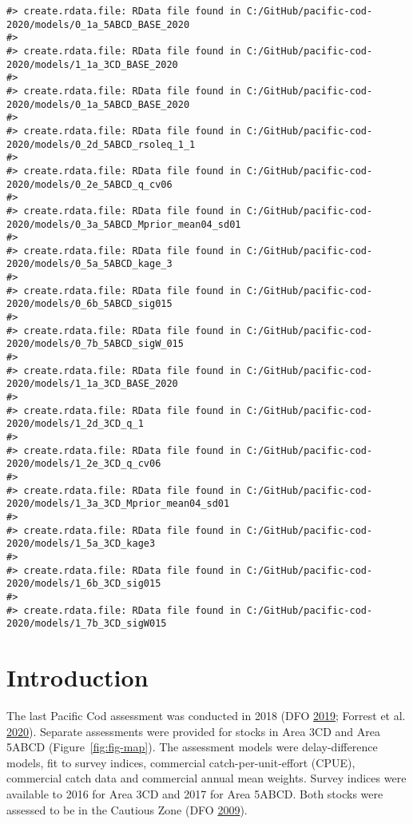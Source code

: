 \documentclass[11pt]{book}
\begin{document}
\frontmatter
\begin{verbatim}
#> create.rdata.file: RData file found in C:/GitHub/pacific-cod-2020/models/0_1a_5ABCD_BASE_2020
#> 
#> create.rdata.file: RData file found in C:/GitHub/pacific-cod-2020/models/1_1a_3CD_BASE_2020
#> 
#> create.rdata.file: RData file found in C:/GitHub/pacific-cod-2020/models/0_1a_5ABCD_BASE_2020
#> 
#> create.rdata.file: RData file found in C:/GitHub/pacific-cod-2020/models/0_2d_5ABCD_rsoleq_1_1
#> 
#> create.rdata.file: RData file found in C:/GitHub/pacific-cod-2020/models/0_2e_5ABCD_q_cv06
#> 
#> create.rdata.file: RData file found in C:/GitHub/pacific-cod-2020/models/0_3a_5ABCD_Mprior_mean04_sd01
#> 
#> create.rdata.file: RData file found in C:/GitHub/pacific-cod-2020/models/0_5a_5ABCD_kage_3
#> 
#> create.rdata.file: RData file found in C:/GitHub/pacific-cod-2020/models/0_6b_5ABCD_sig015
#> 
#> create.rdata.file: RData file found in C:/GitHub/pacific-cod-2020/models/0_7b_5ABCD_sigW_015
#> 
#> create.rdata.file: RData file found in C:/GitHub/pacific-cod-2020/models/1_1a_3CD_BASE_2020
#> 
#> create.rdata.file: RData file found in C:/GitHub/pacific-cod-2020/models/1_2d_3CD_q_1
#> 
#> create.rdata.file: RData file found in C:/GitHub/pacific-cod-2020/models/1_2e_3CD_q_cv06
#> 
#> create.rdata.file: RData file found in C:/GitHub/pacific-cod-2020/models/1_3a_3CD_Mprior_mean04_sd01
#> 
#> create.rdata.file: RData file found in C:/GitHub/pacific-cod-2020/models/1_5a_3CD_kage3
#> 
#> create.rdata.file: RData file found in C:/GitHub/pacific-cod-2020/models/1_6b_3CD_sig015
#> 
#> create.rdata.file: RData file found in C:/GitHub/pacific-cod-2020/models/1_7b_3CD_sigW015
\end{verbatim}
\clearpage

\hypertarget{introduction}{%
\section{Introduction}\label{introduction}}

The last Pacific Cod assessment was conducted in 2018 (DFO \protect\hyperlink{ref-dfo2019}{2019}; Forrest et al. \protect\hyperlink{ref-forrest2020}{2020}). Separate assessments were provided for stocks in Area 3CD and Area 5ABCD (Figure~\ref{fig:fig-map}). The assessment models were delay-difference models, fit to survey indices, commercial catch-per-unit-effort (CPUE), commercial catch data and commercial annual mean weights. Survey indices were available to 2016 for Area 3CD and 2017 for Area 5ABCD. Both stocks were assessed to be in the Cautious Zone (DFO \protect\hyperlink{ref-dfo2009}{2009}).
\end{document}
